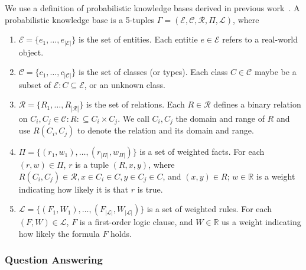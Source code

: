 We use a definition of probabilistic knowledge bases derived in previous work~\cite{chen2014knowledge}.
A probabilistic knowledge base is a 5-tuples \(\Gamma = (\mathcal{E}, \mathcal{C}, \mathcal{R}, \Pi, \mathcal{L})\), where
\begin{enumerate}[leftmargin=0cm,itemindent=.5cm,labelwidth=\itemindent,labelsep=0cm,align=left]
\vspace{-1em}
\item \(\mathcal{E} = \{ e_1, \ldots, e_{|\mathcal{E}|} \} \) is the set of entities.
Each entitie \( e \in \mathcal{E} \) refers to a real-world object.

\vspace{-1em}
\item \(\mathcal{C} = \{ c_1, \ldots, c_{|\mathcal{C}|} \} \) is the set of classes (or types).
Each class \( C \in \mathcal{C} \) maybe be a subset of \(\mathcal{E} : C \subseteq \mathcal{E}\), or an unknown class.

\vspace{-1em}
\item \(\mathcal{R} = \{ R_1, \ldots, R_{|\mathcal{R}|} \} \) is the set of relations.
Each \(R \in \mathcal{R} \) defines a binary relation on \(C_i, C_j \in \mathcal{C}: R: \subseteq C_i \times C_j\).
We call \(C_i, C_j\) the domain and range of \(R\) and use \(R(C_i,C_j)\) to denote the relation and its domain and range.


\vspace{-1em}
\item \(\Pi = \{(r_1, w_1), \ldots, (r_{|\Pi|}, w_{\Pi|})\} \) is a set of weighted facts.
For each \( (r,w) \in \Pi\), \(r\) is a tuple  \((R,x,y)\),
where \(R(C_i,C_j) \in \mathcal{R}, x \in C_i \in C, y \in C_j \in C\), and \((x,y) \in R\);
\(w \in \mathbb{R}\) is a weight indicating how likely it is that \(r\) is true. 

\vspace{-1em}
\item \(\mathcal{L} = \{(F_1,W_1),\ldots, (F_{|\mathcal{L}|}, W_{|\mathcal{L}|}) \} \) is a set of weighted rules.
For each \((F, W) \in \mathcal{L} \), \(F\) is a first-order logic clause, and
\(W \in \mathbb{R} \) us a weight indicating how likely the formula \(F\)
holds. 

\end{enumerate}


\subsubsection{Question Answering}

